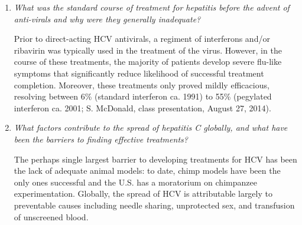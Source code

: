 \documentclass[11pt,final] {article}
\begin{document}
\begin{enumerate}
	\item \textit{What was the standard course of treatment for hepatitis before the advent of anti-virals and why were they generally inadequate?}
	
	Prior to direct-acting HCV antivirals, a regiment of interferons and/or ribavirin was typically used in the treatment of the virus. However, in the course of these treatments, the majority of patients develop severe flu-like symptoms that significantly reduce likelihood of successful treatment completion. Moreover, these treatments only proved mildly efficacious, resolving between 6\% (standard interferon ca. 1991) to 55\% (pegylated interferon ca. 2001; S. McDonald, class presentation, August 27, 2014).

	\item \textit{What factors contribute to the spread of hepatitis C globally, and what have been the barriers to finding effective treatments?}
	
	The perhaps single largest barrier to developing treatments for HCV has been the lack of adequate animal models: to date, chimp models have been the only ones successful and the U.S. has a moratorium on chimpanzee experimentation. Globally, the spread of HCV is attributable largely to preventable causes including needle sharing, unprotected sex, and transfusion of unscreened blood.
\end{enumerate}
\end{document}
